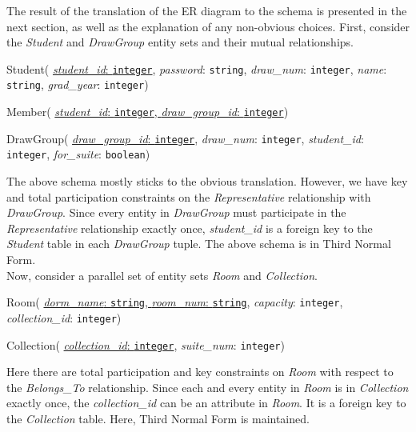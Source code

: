 The result of the translation of the ER diagram to the schema is presented in
the next section, as well as the explanation of any non-obvious choices. First,
consider the \emph{Student} and \emph{DrawGroup} entity sets and their mutual
relationships.

\begin{description}
  \item Student(
        \ul{\emph{student_id}: \texttt{integer}},
        \emph{password}: \texttt{string},
        \emph{draw\_num}: \texttt{integer},
        \emph{name}: \texttt{string},
        \emph{grad\_year}: \texttt{integer})

  \item Member(
        \ul{\emph{student\_id}: \texttt{integer},
        \emph{draw\_group\_id}: \texttt{integer}})

  \item DrawGroup(
        \ul{\emph{draw\_group\_id}: \texttt{integer}},
        \emph{draw\_num}: \texttt{integer},
        \emph{student\_id}: \texttt{integer},
        \emph{for\_suite}: \texttt{boolean})
\end{description}

The above schema mostly sticks to the obvious translation.  However, we have key
and total participation constraints on the \emph{Representative} relationship
with \emph{DrawGroup}. Since every entity in \emph{DrawGroup} must participate
in the \emph{Representative} relationship exactly once, \emph{student\_id} is a
foreign key to the \emph{Student} table in each \emph{DrawGroup} tuple. The
above schema is in Third Normal Form. \\

Now, consider a parallel set of entity sets \emph{Room} and \emph{Collection}.

\begin{description}
  \item Room(
        \ul{\emph{dorm\_name}: \texttt{string},
        \emph{room\_num}: \texttt{string}},
        \emph{capacity}: \texttt{integer},
        \emph{collection\_id}: \texttt{integer})

  \item Collection(
        \ul{\emph{collection\_id}: \texttt{integer}},
        \emph{suite\_num}: \texttt{integer})
\end{description}

Here there are total participation and key constraints on \emph{Room} with
respect to the \emph{Belongs\_To} relationship.  Since each and every entity in
\emph{Room} is in \emph{Collection} exactly once, the \emph{collection\_id} can
be an attribute in \emph{Room}. It is a foreign key to the
\emph{Collection} table. Here, Third Normal Form is maintained.

